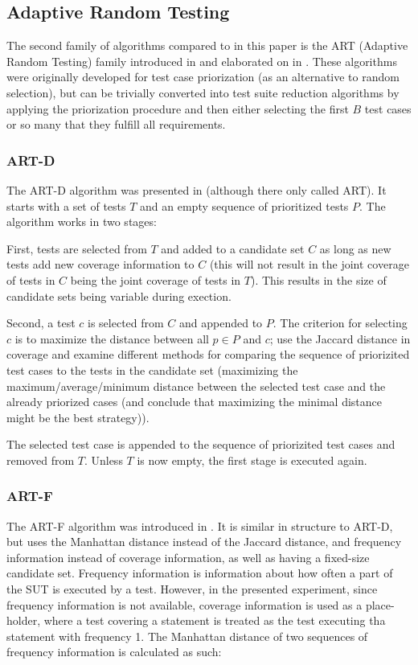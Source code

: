 \subsection{Adaptive Random Testing}

The second family of algorithms compared to in this paper is the ART
(Adaptive Random Testing) family introduced in \cite{jiang2009adaptive}
and elaborated on in \cite{chen2010adaptive}. These algorithms were
originally developed for test case priorization (as an alternative
to random selection), but can be trivially converted into test suite
reduction algorithms by applying the priorization procedure and then
either selecting the first $B$ test cases or so many that they fulfill
all requirements.

\subsubsection{ART-D}

The ART-D algorithm was presented in \cite{jiang2009adaptive} (although
there only called ART). It starts with a set of tests $T$ and an empty
sequence of prioritized tests $P$. The algorithm works in two stages:

First, tests are selected from $T$ and added to a candidate set $C$
as long as new tests add new coverage information to $C$ (this will not
result in the joint coverage of tests in $C$ being the joint coverage of
tests in $T$). This results in the size of candidate sets being variable
during exection.

Second, a test $c$ is selected from $C$ and appended to $P$. The
criterion for selecting $c$ is to maximize the distance between all $p
\in P$ and $c$; \cite{jiang2009adaptive} use the Jaccard distance in
coverage and examine different methods for comparing the sequence of
priorizited test cases to the tests in the candidate set (maximizing
the maximum/average/minimum distance between the selected test case and
the already priorized cases (and conclude that maximizing the minimal
distance might be the best strategy)).

The selected test case is appended to the sequence of priorizited test
cases and removed from $T$. Unless $T$ is now empty, the first stage is
executed again.

\subsubsection{ART-F}

The ART-F algorithm was introduced in \cite{zhou2012fault}. It
is similar in structure to ART-D, but uses the Manhattan distance
instead of the Jaccard distance, and frequency information instead
of coverage information, as well as having a fixed-size candidate
set. Frequency information is information about how often a part of the
SUT is executed by a test. However, in the presented experiment, since
frequency information is not available, coverage information is used as
a place-holder, where a test covering a statement is treated as the test
executing tha statement with frequency 1. The Manhattan distance of two
sequences of frequency information is calculated as such:

